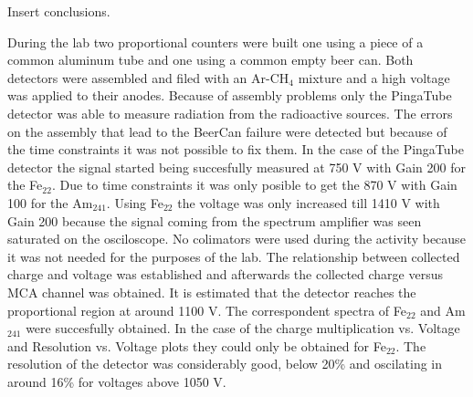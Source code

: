Insert conclusions.

During the lab two proportional counters were built one using a piece of a common aluminum tube and one using a common empty beer can. 
Both detectors were assembled and filed with an Ar-CH$_4$ mixture and a high voltage was applied to their anodes. Because of assembly problems only the PingaTube detector was able to measure radiation 
from the radioactive sources. The errors on the assembly that lead to the BeerCan failure were detected but because of the time constraints it was not possible to fix them. In the case of the PingaTube detector 
the signal started being succesfully 
measured at 750 V with Gain 200 for the Fe$_{22}$. Due to time constraints it was only posible to get the 870 V with Gain 100 for the Am$_{241}$. Using Fe$_{22}$ the voltage was only increased till 1410 V with Gain 200 
because the signal coming from the spectrum amplifier was seen saturated on the osciloscope. No colimators were used during the activity because it was not needed for the purposes of the lab.
The relationship between collected charge and voltage was established and afterwards the collected charge versus MCA channel was obtained. It is estimated that the detector reaches the proportional region at around 1100 V.
The correspondent spectra of Fe$_{22}$ and Am$_{241}$ were succesfully obtained. In the case of the charge multiplication vs. Voltage​ and Resolution vs. Voltage​ plots they could only be obtained for Fe$_{22}$. 
The resolution of the detector was considerably good, below 20\% and oscilating in around 16\% for voltages above 1050 V.
